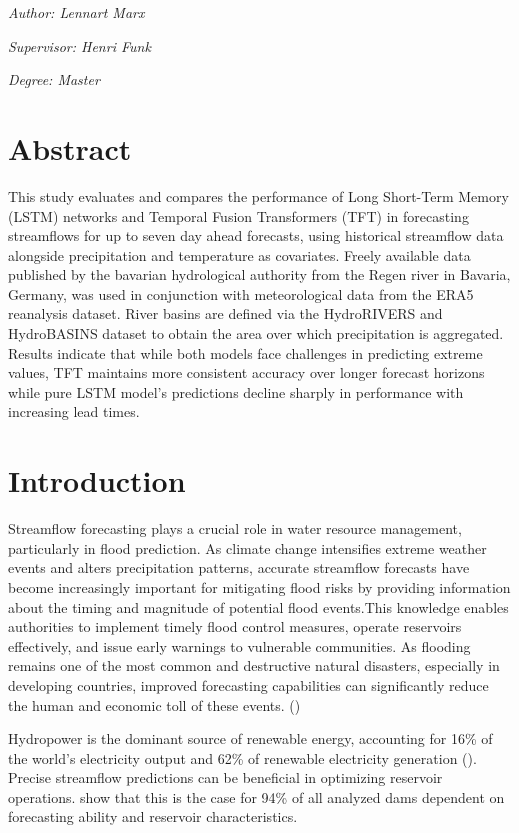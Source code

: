 \documentclass[
]{krantz}
\begin{document}
\emph{Author: Lennart Marx}

\emph{Supervisor: Henri Funk}

\emph{Degree: Master}

\section{Abstract}\label{abstract-2}

This study evaluates and compares the performance of Long Short-Term Memory (LSTM) networks and Temporal Fusion Transformers (TFT) in forecasting streamflows for up to seven day ahead forecasts, using historical streamflow data alongside precipitation and temperature as covariates. Freely available data published by the bavarian hydrological authority from the Regen river in Bavaria, Germany, was used in conjunction with meteorological data from the ERA5 reanalysis dataset. River basins are defined via the HydroRIVERS and HydroBASINS dataset to obtain the area over which precipitation is aggregated. Results indicate that while both models face challenges in predicting extreme values, TFT maintains more consistent accuracy over longer forecast horizons while pure LSTM model's predictions decline sharply in performance with increasing lead times.

\section{Introduction}\label{introduction-3}

Streamflow forecasting plays a crucial role in water resource management, particularly in flood prediction. As climate change intensifies extreme weather events and alters precipitation patterns, accurate streamflow forecasts have become increasingly important for mitigating flood risks by providing information about the timing and magnitude of potential flood events.This knowledge enables authorities to implement timely flood control measures, operate reservoirs effectively, and issue early warnings to vulnerable communities. As flooding remains one of the most common and destructive natural disasters, especially in developing countries, improved forecasting capabilities can significantly reduce the human and economic toll of these events. (\citet{Nearing2024})

Hydropower is the dominant source of renewable energy, accounting for 16\% of the world's electricity output and 62\% of renewable electricity generation (\citet{hess-26-2431-2022}). Precise streamflow predictions can be beneficial in optimizing reservoir operations. \citet{hess-26-2431-2022} show that this is the case for 94\% of all analyzed dams dependent on forecasting ability and reservoir characteristics.
\end{document}
